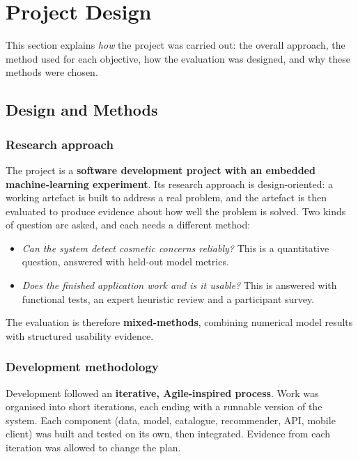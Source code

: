 \section{Project Design}
\label{sec:design}

This section explains \emph{how} the project was carried out: the overall approach, the method used for each objective, how the evaluation was designed, and why these methods were chosen.

\subsection{Design and Methods}

\subsubsection*{Research approach}

The project is a \textbf{software development project with an embedded machine-learning experiment}. Its research approach is design-oriented: a working artefact is built to address a real problem, and the artefact is then evaluated to produce evidence about how well the problem is solved. Two kinds of question are asked, and each needs a different method:
\begin{itemize}
  \item \emph{Can the system detect cosmetic concerns reliably?} This is a quantitative question, answered with held-out model metrics.
  \item \emph{Does the finished application work and is it usable?} This is answered with functional tests, an expert heuristic review and a participant survey.
\end{itemize}
The evaluation is therefore \textbf{mixed-methods}, combining numerical model results with structured usability evidence.

\subsubsection*{Development methodology}

Development followed an \textbf{iterative, Agile-inspired process}. Work was organised into short iterations, each ending with a runnable version of the system. Each component (data, model, catalogue, recommender, API, mobile client) was built and tested on its own, then integrated. Evidence from each iteration was allowed to change the plan.

